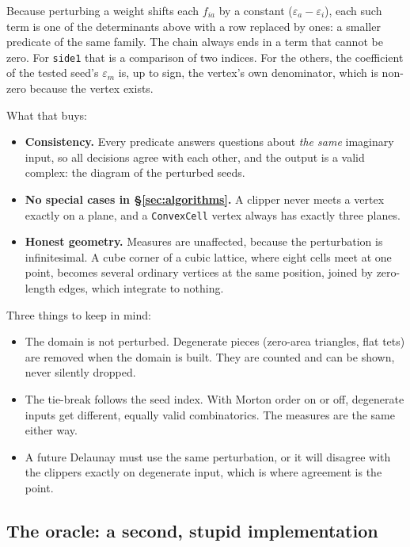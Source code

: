 \documentclass[11pt,a4paper]{article}
\newcommand{\code}[1]{\texttt{#1}}          %
\newcommand{\secref}[1]{\S\ref{#1}}
\begin{document}
Because perturbing a weight shifts each $f_{ia}$ by a constant ($\varepsilon_a -
\varepsilon_i$), each such term is one of the determinants above with a row replaced by ones: a
smaller predicate of the same family. The chain always ends in a term that cannot be zero. For
\code{side1} that is a comparison of two indices. For the others, the coefficient of the tested
seed's $\varepsilon_m$ is, up to sign, the vertex's own denominator, which is non-zero because
the vertex exists.

What that buys:

\begin{itemize}
\item \textbf{Consistency.} Every predicate answers questions about \emph{the same} imaginary
  input, so all decisions agree with each other, and the output is a valid complex: the diagram
  of the perturbed seeds.
\item \textbf{No special cases in \secref{sec:algorithms}.} A clipper never meets a vertex exactly
  on a plane, and a \code{ConvexCell} vertex always has exactly three planes.
\item \textbf{Honest geometry.} Measures are unaffected, because the perturbation is
  infinitesimal. A cube corner of a cubic lattice, where eight cells meet at one point, becomes
  several ordinary vertices at the same position, joined by zero-length edges, which integrate to
  nothing.
\end{itemize}

Three things to keep in mind:

\begin{itemize}
\item The domain is not perturbed. Degenerate pieces (zero-area triangles, flat tets) are removed
  when the domain is built. They are counted and can be shown, never silently dropped.
\item The tie-break follows the seed index. With Morton order on or off, degenerate inputs get
  different, equally valid combinatorics. The measures are the same either way.
\item A future Delaunay must use the same perturbation, or it will disagree with the clippers
  exactly on degenerate input, which is where agreement is the point.
\end{itemize}

\subsection{The oracle: a second, stupid implementation}\label{ssec:oracle}
\end{document}

